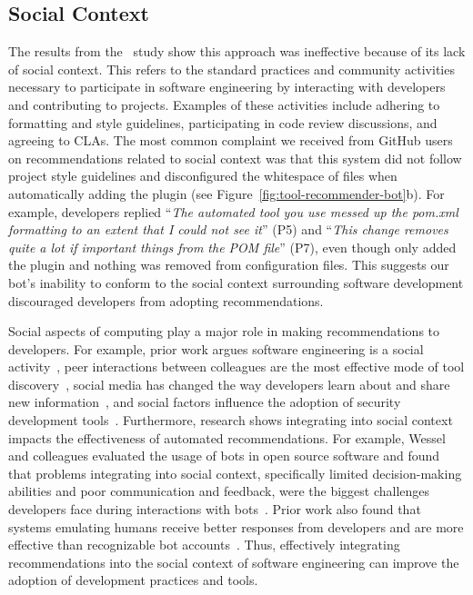 \subsection{Social Context}

The results from the \tele~study show this approach was ineffective because of its lack of social context. This refers to the standard practices and community activities necessary to participate in software engineering by interacting with developers and contributing to projects. Examples of these activities include adhering to formatting and style guidelines, participating in code review discussions, and agreeing to CLAs. The most common complaint we received from GitHub users on \toolone recommendations related to social context was that this system did not follow project style guidelines and disconfigured the whitespace of \pom files when automatically adding the \EP plugin (see Figure~\ref{fig:tool-recommender-bot}b). For example, developers replied ``\textit{The automated tool you use messed up the pom.xml formatting to an extent that I could not see it}'' (P5) and ``\textit{This change removes quite a lot if important things from the POM file}'' (P7), even though \toolone only added the \EP plugin and nothing was removed from configuration files. This suggests our bot's inability to conform to the social context surrounding software development discouraged developers from adopting recommendations.

Social aspects of computing play a major role in making recommendations to developers. For example, prior work argues software engineering is a social activity~\cite{ahmadi2008survey}, peer interactions between colleagues are the most effective mode of tool discovery~\cite{Murphy-Hill2011PeerInteraction}, social media has changed the way developers learn about and share new information~\cite{begel2010social, singer2014twitter}, and social factors influence the adoption of security development tools~\cite{Xiao2014Security}. Furthermore, research shows integrating into social context impacts the effectiveness of automated recommendations. For example, Wessel and colleagues evaluated the usage of bots in open source software and found that problems integrating into social context, specifically limited decision-making abilities and poor communication and feedback, were the biggest challenges developers face during interactions with bots~\cite{wessel2018power}. Prior work also found that systems emulating humans receive better responses from developers and are more effective than recognizable bot accounts~\cite{murgia2016among}. Thus, effectively integrating recommendations into the social context of software engineering can improve the adoption of development practices and tools.

